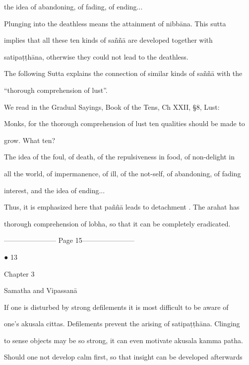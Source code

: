      the idea of abandoning, of fading, of ending... 



Plunging   into   the   deathless   means   the   attainment   of   nibbāna.   This   sutta  

implies   that   all   these   ten   kinds   of   saññā   are   developed   together   with  

satipaṭṭhāna, otherwise they could not lead to the deathless. 



The following Sutta explains the connection of similar kinds of saññā with the  

“thorough comprehension of lust”. 

   We read in the Gradual Sayings, Book of the Tens, Ch XXII, §8, Lust: 



      Monks, for the thorough comprehension of lust ten qualities should be made to  

      grow. What ten? 

         The idea of the foul, of death, of the repulsiveness in food, of non-delight in  

      all the world, of impermanence, of ill, of the not-self, of abandoning, of fading  

      interest, and the idea of ending... 



Thus, it is emphasized here that paññā leads to detachment  . The arahat has  

thorough comprehension of lobha, so that it can be completely eradicated. 


----------------------- Page 15-----------------------

                                                                                          ● 13 



Chapter 3 



Samatha and Vipassanā 



If  one  is  disturbed  by  strong  defilements  it  is  most  difficult  to  be  aware  of  

one’s akusala cittas. Defilements prevent the  arising of  satipaṭṭhāna. Clinging  

to sense objects may be so strong, it can even motivate akusala kamma patha.  

Should one not develop calm first, so that insight can be developed afterwards  

